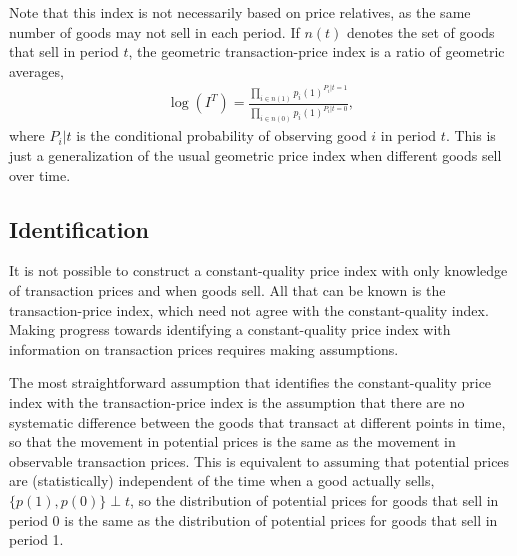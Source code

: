\documentclass[]{article}
\begin{document}
Note that this index is not necessarily based on price relatives, as the same number of goods may not sell in each period. If \(n(t)\) denotes the set of goods that sell in period \(t\), the geometric transaction-price index is a ratio of geometric averages,
\begin{align*}
\log(I^{T}) = \frac{\prod_{i \in n(1)} p_{i}(1)^{P_{i}|t = 1}}{\prod_{i \in n(0)} p_{i}(1)^{P_{i}|t = 0}},
\end{align*}
where \(P_{i} | t\) is the conditional probability of observing good \(i\) in period \(t\). This is just a generalization of the usual geometric price index when different goods sell over time.

\hypertarget{identification}{%
\subsection{Identification}\label{identification}}

It is not possible to construct a constant-quality price index with only knowledge of transaction prices and when goods sell. All that can be known is the transaction-price index, which need not agree with the constant-quality index. Making progress towards identifying a constant-quality price index with information on transaction prices requires making assumptions.

The most straightforward assumption that identifies the constant-quality price index with the transaction-price index is the assumption that there are no systematic difference between the goods that transact at different points in time, so that the movement in potential prices is the same as the movement in observable transaction prices. This is equivalent to assuming that potential prices are (statistically) independent of the time when a good actually sells, \(\{p(1), p(0)\} \perp t\), so the distribution of potential prices for goods that sell in period 0 is the same as the distribution of potential prices for goods that sell in period 1.
\end{document}

